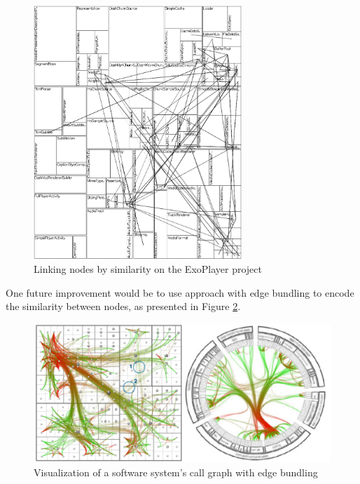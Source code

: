 \begin{figure}[H]
  \centering
  \includegraphics[width=0.7\textwidth]{figures/treemap_similarity.png}
  \caption{Linking nodes by similarity on the ExoPlayer project}
  \label{fig:treemap_similarity}
\end{figure}

One future improvement would be to use \citet{ref:holten06} approach with edge bundling to encode the similarity between nodes, as presented in Figure \ref{fig:holten}.

\begin{figure}[H]
  \centering
  \includegraphics[width=1.0\textwidth]{figures/holten.png}
  \caption{Visualization of a software system's call graph with edge bundling}
  \label{fig:holten}
\end{figure}
